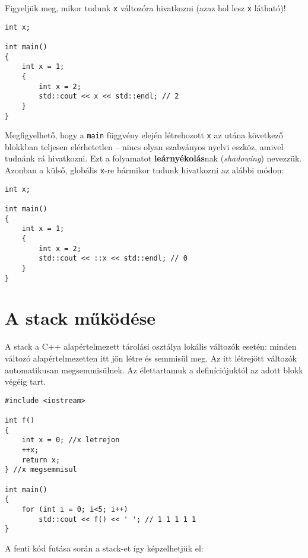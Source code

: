 \documentclass[a4paper,11.5pt]{article}
\begin{document}
	Figyeljük meg, mikor tudunk \texttt{x} változóra hivatkozni (azaz hol lesz \texttt{x} látható)!
	\begin{lstlisting}
int x;

int main()
{
	int x = 1;
	{
		int x = 2;
		std::cout << x << std::endl; // 2
	}
}
	\end{lstlisting}
	Megfigyelhető, hogy a \texttt{main} függvény elején létrehozott \texttt{x} az utána következő blokkban teljesen elérhetetlen -- nincs olyan szabványos nyelvi eszköz, amivel tudnánk rá hivatkozni. Ezt a folyamatot \textbf{leárnyékolás}nak (\textit{shadowing}) nevezzük. Azonban a külső, globális \texttt{x}-re bármikor tudunk hivatkozni az alábbi módon:
	\begin{lstlisting}
int x;

int main()
{
	int x = 1;
	{
		int x = 2;
		std::cout << ::x << std::endl; // 0
	}
}
	\end{lstlisting}
	
	\section{A stack működése}
	A stack a C++ alapértelmezett tárolási osztálya lokális változók esetén: minden változó alapértelmezetten itt jön létre és semmisül meg. Az itt létrejött változók automatikusan megsemmisülnek. Az élettartamuk a definíciójuktól az adott blokk végéig tart.
	
	\begin{lstlisting}
#include <iostream>

int f()
{
	int x = 0; //x letrejon
	++x;
	return x;
} //x megsemmisul

int main()
{
	for (int i = 0; i<5; i++)
		std::cout << f() << ' '; // 1 1 1 1 1
}
	\end{lstlisting}
	\medskip
	
	A fenti kód futása során a stack-et így képzelhetjük el:
	
\end{document}
